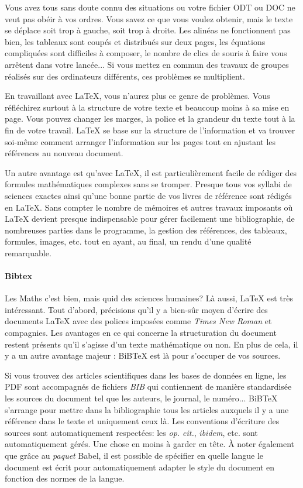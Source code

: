 Vous avez tous sans doute connu des situations ou votre fichier ODT ou DOC ne veut pas obéir à vos ordres. Vous savez ce que vous voulez obtenir, mais le texte se déplace soit trop à gauche, soit trop à droite. Les alinéas ne fonctionnent pas bien, les tableaux sont coupés et distribués sur deux pages, les équations compliquées sont difficiles à composer, le nombre de clics de souris à faire vous arrêtent dans votre lancée... Si vous mettez en commun des travaux de groupes réalisés sur des ordinateurs différents, ces problèmes se multiplient.

En travaillant avec \LaTeX{}, vous n'aurez plus ce genre de problèmes. Vous réfléchirez surtout à la structure de votre texte et beaucoup moins à sa mise en page. Vous pouvez changer les marges, la police et la grandeur du texte tout à la fin de votre travail. \LaTeX{} se base sur la structure de l'information et va trouver soi-même comment arranger l'information sur les pages tout en ajustant les références au nouveau document.

Un autre avantage est qu'avec \LaTeX{}, il est particulièrement facile de rédiger des formules mathématiques complexes sans se tromper. Presque tous vos syllabi de sciences exactes ainsi qu'une bonne partie de vos livres de référence sont rédigés en \LaTeX{}. Sans compter le nombre de mémoires et autres travaux imposants où \LaTeX{} devient presque indispensable pour gérer facilement une bibliographie, de nombreuses parties dans le programme, la gestion des références, des tableaux, formules, images, etc. tout en ayant, au final, un rendu d'une qualité remarquable.

\paragraph{Bibtex}
Les Maths c'est bien, mais quid des sciences humaines? Là aussi, \LaTeX{} est très intéressant. Tout d'abord, précisions qu'il y a bien-sûr moyen d'écrire des documents \LaTeX{} avec des polices imposées comme \textit{Times New Roman} et compagnies.
Les avantages en ce qui concerne la structuration du document restent présents qu'il s'agisse d'un texte mathématique ou non. En plus de cela, il y a un autre avantage majeur : BiB\TeX{} est là pour s'occuper de vos sources.

Si vous trouvez des articles scientifiques dans les bases de données en ligne, les PDF sont accompagnés de fichiers \textit{BIB} qui contiennent de manière standardisée les sources du document tel que les auteurs, le journal, le numéro... BiB\TeX{} s'arrange pour mettre dans la bibliographie tous les articles auxquels il y a une référence dans le texte et uniquement ceux là. Les conventions d'écriture des sources sont automatiquement respectées: les \textit{op. cit.}, \textit{ibidem}, etc. sont automatiquement gérés. Une chose en moins à garder en tête.
À noter également que grâce au \textit{paquet} Babel, il est possible de spécifier en quelle langue le document est écrit pour automatiquement adapter le style du document en fonction des normes de la langue.

